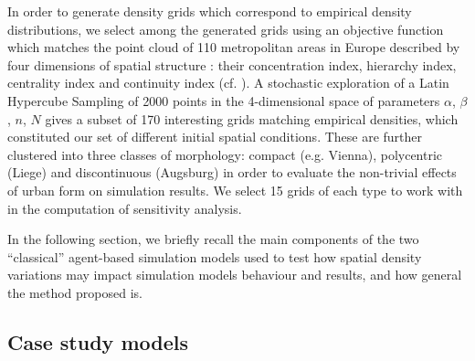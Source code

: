 \documentclass[Royal,sageh,times]{sagej}
\begin{document}

In order to generate density grids which correspond to empirical density distributions, we select among the generated grids using an objective function which matches the point cloud of 110 metropolitan areas in Europe described by four dimensions of spatial structure : their concentration index, hierarchy index, centrality index and continuity index (cf. \cite{LeNechet2015}). A stochastic exploration of a Latin Hypercube Sampling of 2000 points in the 4-dimensional space of parameters {$\alpha$, $\beta$, $n$, $N$} gives a subset of 170 interesting grids matching empirical densities, which constituted our set of different initial spatial conditions. These are further clustered into three classes of morphology: compact (e.g. Vienna), polycentric (Liege) and discontinuous (Augsburg) in order to evaluate the non-trivial effects of urban form on simulation results. We select 15 grids of each type to work with in the computation of sensitivity analysis.  






In the following section, we briefly recall the main components of the two ``classical'' agent-based simulation models used to test how spatial density variations may impact simulation models behaviour and results, and how general the method proposed is.

\subsection{Case study models}
\end{document}
